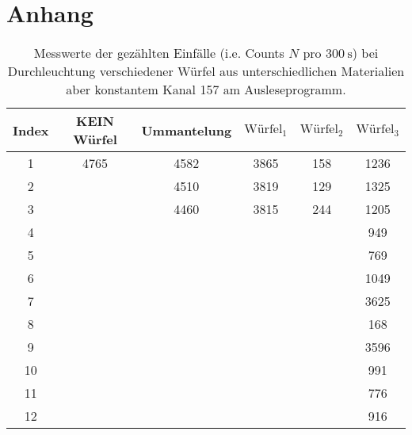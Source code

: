 \newpage
\section{Anhang}
\begin{table}
    \centering
    \caption{Messwerte der gezählten Einfälle (i.e. Counts $N$ pro $\SI{300}{\second}$) bei Durchleuchtung verschiedener Würfel aus unterschiedlichen Materialien aber konstantem
            Kanal 157 am Ausleseprogramm.} 
    \label{tab:1}
    \begin{tabular}{c c c c c c}
    \toprule
    Index & KEIN Würfel  & Ummantelung  & $\text{Würfel}_1 $ &  $\text{Würfel}_2 $  & $\text{Würfel}_3$ \\
    \midrule
1    &  4765   &   4582  &  3865 &   158  &   1236  \\
2    &         &       4510  &      3819 &       129  &   1325  \\
3    &         &       4460  &      3815 &       244  &   1205  \\
4    &         &            &          &           &   949   \\   
5    &         &            &          &           &   769   \\
6    &         &            &          &           &   1049  \\
7    &         &            &          &           &   3625  \\
8    &         &            &          &           &   168   \\
9    &         &            &          &           &   3596  \\
10   &         &            &          &           &   991   \\
11   &         &            &          &           &   776   \\
12   &         &            &          &           &   916   \\
\end{tabular}
\end{table}



